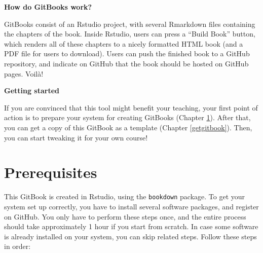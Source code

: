\documentclass[
]{book}
\begin{document}
\textbf{How do GitBooks work?}

GitBooks consist of an Rstudio project, with several Rmarkdown files containing the chapters of the book. Inside Rstudio, users can press a ``Build Book'' button, which renders all of these chapters to a nicely formatted HTML book (and a PDF file for users to download). Users can push the finished book to a GitHub repository, and indicate on GitHub that the book should be hosted on GitHub pages. Voilà!

\textbf{Getting started}

If you are convinced that this tool might benefit your teaching, your first point of action is to prepare your system for creating GitBooks (Chapter \ref{prerequisites}). After that, you can get a copy of this GitBook as a template (Chapter \ref{getgitbook}). Then, you can start tweaking it for your own course!

\hypertarget{prerequisites}{%
\chapter{Prerequisites}\label{prerequisites}}

This GitBook is created in Rstudio, using the \texttt{bookdown} package. To get your system set up correctly, you have to install several software packages, and register on GitHub. You only have to perform these steps once, and the entire process should take approximately 1 hour if you start from scratch. In case some software is already installed on your system, you can skip related steps. Follow these steps in order:
\end{document}
